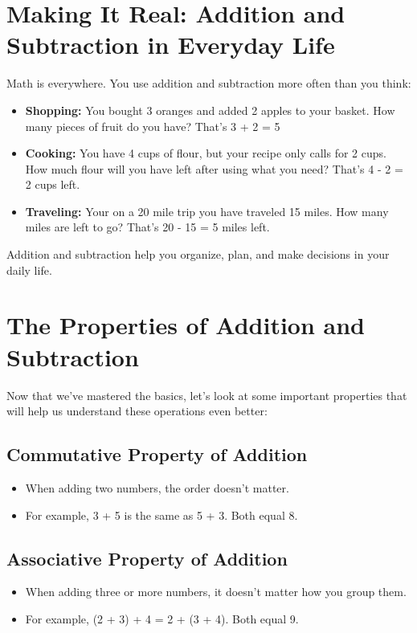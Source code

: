 \section{Making It Real: Addition and Subtraction in Everyday Life}
Math is everywhere. You use addition and subtraction more often than you think:
\begin{itemize}
    \item \textbf{Shopping:} You bought 3 oranges and added 2 apples to your basket. How many pieces of fruit do you have? That’s 3 + 2 = 5
    \item \textbf{Cooking:} You have 4 cups of flour, but your recipe only calls for 2 cups. How much flour will you have left after using what you need? That’s 4 - 2 = 2 cups left.
    \item \textbf{Traveling:} Your on a 20 mile trip you have traveled 15 miles. How many miles are left to go? That’s 20 - 15 = 5 miles left.
\end{itemize}

Addition and subtraction help you organize, plan, and make decisions in your daily life.

\section{The Properties of Addition and Subtraction}
Now that we’ve mastered the basics, let’s look at some important properties that will help us understand these operations even better:

\subsection{Commutative Property of Addition}
\begin{itemize}
    \item When adding two numbers, the order doesn’t matter.
    \item For example, 3 + 5 is the same as 5 + 3. Both equal 8.
\end{itemize}

\subsection{Associative Property of Addition}
\begin{itemize}
    \item When adding three or more numbers, it doesn’t matter how you group them.
    \item For example, (2 + 3) + 4 = 2 + (3 + 4). Both equal 9.
\end{itemize}

